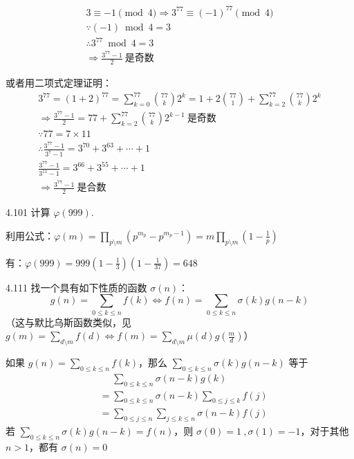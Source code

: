 \begin{gather*}
  3 \equiv -1 \pmod{4} \Rightarrow 3^{77} \equiv (-1)^{77} \pmod{4} \\
  \because (-1) \bmod 4 = 3 \\
  \therefore 3^{77} \bmod 4 = 3 \\
  \Rightarrow \frac{3^{77} - 1}{2} \ \text{是奇数}
\end{gather*}

或者用二项式定理证明：
\begin{gather*}
  3^{77} = (1+2)^{77} = \sum_{k=0}^{77} \binom{77}{k} 2^k = 1 + 2 \binom{77}{1} + \sum_{k=2}^{77} \binom{77}{k} 2^k \\
  \Rightarrow \frac{3^{77} - 1}{2} = 77 + \sum_{k=2}^{77} \binom{77}{k} 2^{k-1} \ \text{是奇数} \\
  \because 77 = 7 \times 11 \\
  \therefore \frac{3^{77}-1}{3^7-1} = 3^{70} + 3^{63} + \cdots + 1 \\
  \frac{3^{77}-1}{3^{11}-1} = 3^{66} + 3^{55} + \cdots + 1 \\
  \Rightarrow \frac{3^{77} - 1}{2} \ \text{是合数}
\end{gather*}

\begin{problem}{4.10}{1}
  计算 \( \varphi(999) \).
\end{problem}

利用公式：\( \varphi(m) = \prod_{p \setminus m} (p^{m_p} - p^{m_p-1}) = m \prod_{p \setminus m} (1 - \frac{1}{p}) \)

有：\( \varphi(999) = 999 (1-\frac{1}{3}) (1-\frac{1}{37}) = 648 \)

\begin{problem}{4.11}{1}
  找一个具有如下性质的函数 \( \sigma(n) \)：
  \[
    g(n) = \sum_{0 \le k \le n} f(k) \Leftrightarrow f(n) = \sum_{0 \le k \le n} \sigma(k) g(n-k)
  \]
  （这与默比乌斯函数类似，见 \( g(m) = \sum_{d \setminus m} f(d) \Leftrightarrow f(m) = \sum_{d \setminus m} \mu(d) g(\frac{m}{d}) \)）
\end{problem}

如果 \( g(n) = \sum_{0 \le k \le n} f(k) \)，那么 \( \sum_{0 \le k \le n} \sigma(k) g(n-k) \) 等于
\begin{align*}
  &\phantom{=} \sum_{0 \le k \le n} \sigma (n - k) g(k) \\
  &= \sum_{0 \le k \le n} \sigma (n - k) \sum_{0 \le j \le k} f(j) \\
  &= \sum_{0 \le j \le n} \sum_{j \le k \le n} \sigma (n - k) f(j)
\end{align*}
若 \( \sum_{0 \le k \le n} \sigma(k) g(n-k) = f(n) \)，则 \( \sigma(0) = 1 \ , \sigma(1) = -1 \)，对于其他 \( n > 1 \)，都有 \( \sigma(n) = 0 \)

